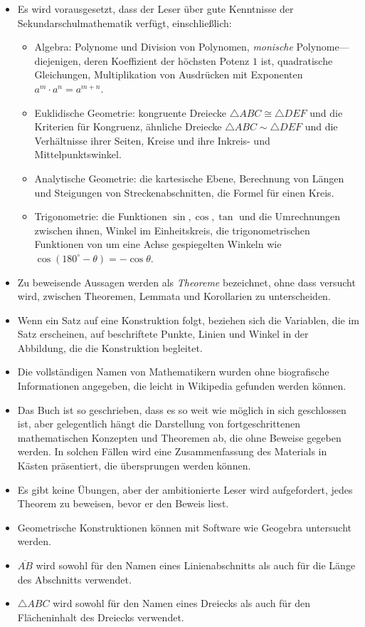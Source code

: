 \begin{itemize}
\item Es wird vorausgesetzt, dass der Leser über gute Kenntnisse der Sekundarschulmathematik verfügt, einschließlich:
\begin{itemize}
\item Algebra: Polynome und Division von Polynomen, \emph{monische} Polynome---diejenigen, deren Koeffizient der höchsten Potenz $1$ ist, quadratische Gleichungen, Multiplikation von Ausdrücken mit Exponenten $a^m\cdot a^n=a^{m+n}$.
\item Euklidische Geometrie: kongruente Dreiecke $\triangle ABC \cong \triangle DEF$ und die Kriterien für Kongruenz, ähnliche Dreiecke $\triangle ABC \sim \triangle DEF$ und die Verhältnisse ihrer Seiten, Kreise und ihre Inkreis- und Mittelpunktswinkel.
\item Analytische Geometrie: die kartesische Ebene, Berechnung von Längen und Steigungen von Streckenabschnitten, die Formel für einen Kreis.
\item Trigonometrie: die Funktionen $\sin,\cos,\tan$ und die Umrechnungen zwischen ihnen, Winkel im Einheitskreis, die trigonometrischen Funktionen von um eine Achse gespiegelten Winkeln wie $\cos (180^\circ-\theta)=-\cos\theta$.
\end{itemize}
\item Zu beweisende Aussagen werden als \emph{Theoreme} bezeichnet, ohne dass versucht wird, zwischen Theoremen, Lemmata und Korollarien zu unterscheiden.
\item Wenn ein Satz auf eine Konstruktion folgt, beziehen sich die Variablen, die im Satz erscheinen, auf beschriftete Punkte, Linien und Winkel in der Abbildung, die die Konstruktion begleitet.
\item Die vollständigen Namen von Mathematikern wurden ohne biografische Informationen angegeben, die leicht in Wikipedia gefunden werden können.
\item Das Buch ist so geschrieben, dass es so weit wie möglich in sich geschlossen ist, aber gelegentlich hängt die Darstellung von fortgeschrittenen mathematischen Konzepten und Theoremen ab, die ohne Beweise gegeben werden. In solchen Fällen wird eine Zusammenfassung des Materials in Kästen präsentiert, die übersprungen werden können.
\item Es gibt keine Übungen, aber der ambitionierte Leser wird aufgefordert, jedes Theorem zu beweisen, bevor er den Beweis liest.
\item Geometrische Konstruktionen können mit Software wie Geogebra untersucht werden.
\item $\overline{AB}$ wird sowohl für den Namen eines Linienabschnitts als auch für die Länge des Abschnitts verwendet.
\item $\triangle ABC$ wird sowohl für den Namen eines Dreiecks als auch für den Flächeninhalt des Dreiecks verwendet.
\end{itemize}



